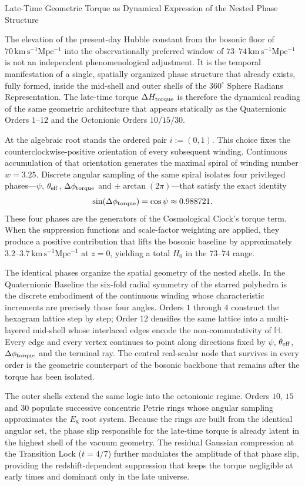 Late-Time Geometric Torque as Dynamical Expression of the Nested Phase Structure

The elevation of the present-day Hubble constant from the bosonic floor of \(70\,\mathrm{km\,s^{-1}Mpc^{-1}}\) into the observationally preferred window of \(73\)–\(74\,\mathrm{km\,s^{-1}Mpc^{-1}}\) is not an independent phenomenological adjustment. It is the temporal manifestation of a single, spatially organized phase structure that already exists, fully formed, inside the mid-shell and outer shells of the \(360^\circ\) Sphere Radians Representation. The late-time torque \(\Delta H_{\rm torque}\) is therefore the dynamical reading of the same geometric architecture that appears statically as the Quaternionic Orders \(1\)–\(12\) and the Octonionic Orders \(10/15/30\).

At the algebraic root stands the ordered pair \(i:=(0,1)\). This choice fixes the counterclockwise-positive orientation of every subsequent winding. Continuous accumulation of that orientation generates the maximal spiral of winding number \(w=3.25\). Discrete angular sampling of the same spiral isolates four privileged phases—\(\psi\), \(\theta_{\rm eff}\), \(\Delta\phi_{\rm torque}\) and \(\pm\arctan(2\pi)\)—that satisfy the exact identity
\[
\sin(\Delta\phi_{\rm torque})=\cos\psi\approx0.988721.
\]
These four phases are the generators of the Cosmological Clock’s torque term. When the suppression functions and scale-factor weighting are applied, they produce a positive contribution that lifts the bosonic baseline by approximately \(3.2\)–\(3.7\,\mathrm{km\,s^{-1}Mpc^{-1}}\) at \(z=0\), yielding a total \(H_0\) in the \(73\)–\(74\) range.

The identical phases organize the spatial geometry of the nested shells. In the Quaternionic Baseline the six-fold radial symmetry of the starred polyhedra is the discrete embodiment of the continuous winding whose characteristic increments are precisely those four angles. Orders \(1\) through \(4\) construct the hexagram lattice step by step; Order \(12\) densifies the same lattice into a multi-layered mid-shell whose interlaced edges encode the non-commutativity of \(\mathbb{H}\). Every edge and every vertex continues to point along directions fixed by \(\psi\), \(\theta_{\rm eff}\), \(\Delta\phi_{\rm torque}\) and the terminal ray. The central real-scalar node that survives in every order is the geometric counterpart of the bosonic backbone that remains after the torque has been isolated.

The outer shells extend the same logic into the octonionic regime. Orders \(10\), \(15\) and \(30\) populate successive concentric Petrie rings whose angular sampling approximates the \(E_8\) root system. Because the rings are built from the identical angular set, the phase slip responsible for the late-time torque is already latent in the highest shell of the vacuum geometry. The residual Gaussian compression at the Transition Lock (\(t=4/7\)) further modulates the amplitude of that phase slip, providing the redshift-dependent suppression that keeps the torque negligible at early times and dominant only in the late universe.

